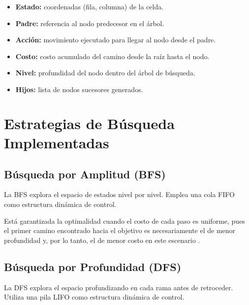 \documentclass{article}
\begin{document}
\begin{itemize}

    \item \textbf{Estado:} coordenadas (fila, columna) de la celda.

    \item \textbf{Padre:} referencia al nodo predecesor en el árbol.

    \item \textbf{Acción:} movimiento ejecutado para llegar al nodo
    desde el padre.

    \item \textbf{Costo:} costo acumulado del camino desde la raíz
    hasta el nodo.

    \item \textbf{Nivel:} profundidad del nodo dentro del árbol de
    búsqueda.

    \item \textbf{Hijos:} lista de nodos sucesores generados.

\end{itemize}


\section{Estrategias de Búsqueda Implementadas}

\subsection{Búsqueda por Amplitud (BFS)}

La BFS explora el espacio de estados nivel por nivel. Emplea una
cola FIFO como estructura dinámica de control.

Está garantizada la optimalidad cuando el costo de cada paso es
uniforme, pues el primer camino encontrado hacia el objetivo es
necesariamente el de menor profundidad y, por lo tanto, el de menor
costo en este escenario \cite{russell2021artificial}.

\subsection{Búsqueda por Profundidad (DFS)}

La DFS explora el espacio profundizando en cada rama antes de
retroceder. Utiliza una pila LIFO como estructura dinámica de
control.
\end{document}
